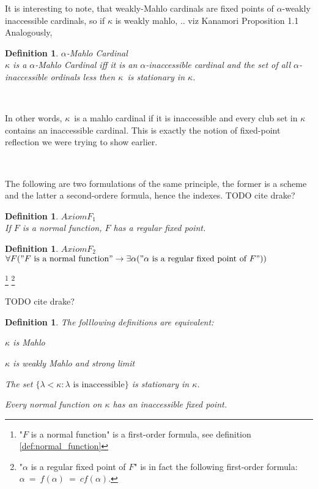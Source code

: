 \documentclass[12pt,a4paper]{article}
\newtheorem{definition}[theorem]{Definition}
\newcommand{\then}{\rightarrow}
\newcommand{\bce}{\begin{compactenum}}
\newcommand{\ece}{\end{compactenum}}
\begin{document}
It is interesting to note, that weakly-Mahlo cardinals are fixed points of $\alpha$-weakly inaccessible cardinals, so if $\kappa$ is weakly mahlo,  .. viz Kanamori Proposition 1.1
Analogously, 
\begin{definition}{$\alpha$-Mahlo Cardinal}\label{def:alpha_mahlo_cardinal}\\
$\kappa$ is a \emph{$\alpha$-Mahlo Cardinal} iff it is an $\alpha$-inaccessible cardinal and the set of all $\alpha$-inaccessible ordinals less then $\kappa$ is stationary in $\kappa$.
\end{definition}

\

In other words, $\kappa$ is a mahlo cardinal if it is inaccessible and every club set in $\kappa$ contains an inaccessible cardinal. This is exactly the notion of fixed-point reflection we were trying to show earlier.

\

The following are two formulations of the same principle, the former is a scheme and the latter a second-ordere formula, hence the indexes.
TODO cite drake?
\begin{definition}{$Axiom F_1$}\\
If $F$ is a normal function, $F$ has a regular fixed point.
\end{definition}
\begin{definition}{$Axiom F_2$}\\
$\forall F("F\mbox{ is a normal function}" \then \exists\alpha("\alpha\mbox{ is a regular fixed point of }F"))$
\end{definition}
\footnote{"$F$ is a normal function" is a first-order formula, see definition \ref{def:normal_function}}
\footnote{"$\alpha$ is a regular fixed point of $F$" is in fact the following first-order formula: $\alpha\ =\ f(\alpha)\ =\ cf(\alpha).$}
\

TODO cite drake?
\begin{definition}{}\label{def:mahlo_equivalent}
The folllowing definitions are equivalent:
\bce[(i)]
\item $\kappa$ is Mahlo
\item $\kappa$ is weakly Mahlo and strong limit
\item The set $\{\lambda < \kappa : \lambda\mbox{ is inaccessible}\}$ is stationary in $\kappa$.
\item Every normal function on $\kappa$ has an inaccessible fixed point.
\ece
\end{definition}
\end{document}
